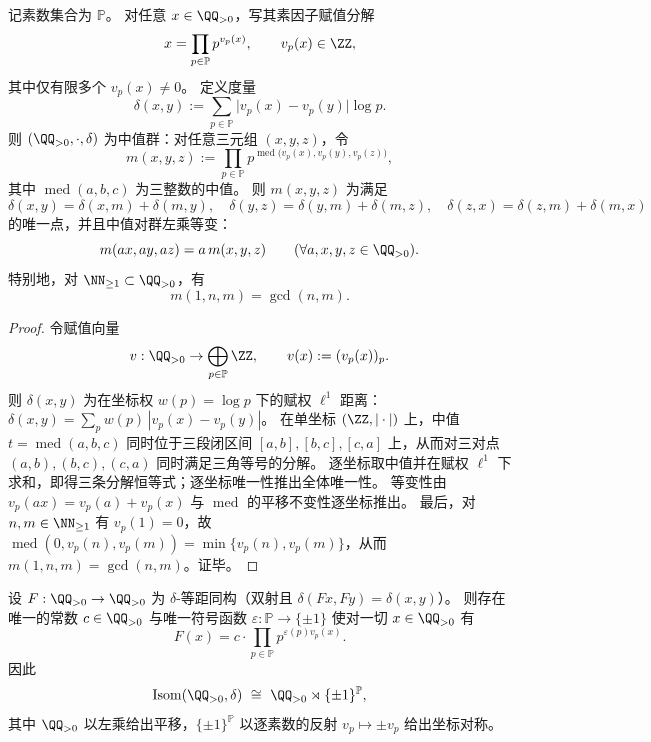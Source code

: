 \begin{theorem}[素因子赋值度量的中值群结构]\label{thm:conclusion-valuation-median-group}
记素数集合为 \(\mathbb P\)。
对任意 \(x\in\QQ_{>0}\)，写其素因子赋值分解
\[
x=\prod_{p\in\mathbb P}p^{v_p(x)},\qquad v_p(x)\in\ZZ,
\]
其中仅有限多个 \(v_p(x)\neq 0\)。
定义度量
\[
\delta(x,y):=\sum_{p\in\mathbb P}\bigl|v_p(x)-v_p(y)\bigr|\log p.
\]
则 \((\QQ_{>0},\cdot,\delta)\) 为中值群：对任意三元组 \((x,y,z)\)，令
\[
m(x,y,z):=\prod_{p\in\mathbb P}p^{\operatorname{med}\bigl(v_p(x),v_p(y),v_p(z)\bigr)},
\]
其中 \(\operatorname{med}(a,b,c)\) 为三整数的中值。
则 \(m(x,y,z)\) 为满足
\[
\delta(x,y)=\delta(x,m)+\delta(m,y),\quad
\delta(y,z)=\delta(y,m)+\delta(m,z),\quad
\delta(z,x)=\delta(z,m)+\delta(m,x)
\]
的唯一点，并且中值对群左乘等变：
\[
m(ax,ay,az)=a\,m(x,y,z)\qquad(\forall a,x,y,z\in\QQ_{>0}).
\]
特别地，对 \(\NN_{\ge 1}\subset\QQ_{>0}\)，有
\[
m(1,n,m)=\gcd(n,m).
\]
\end{theorem}

\begin{proof}
令赋值向量
\[
v:\QQ_{>0}\to \bigoplus_{p\in\mathbb P}\ZZ,\qquad v(x):=(v_p(x))_{p}.
\]
则 \(\delta(x,y)\) 为在坐标权 \(w(p)=\log p\) 下的赋权 \(\ell^1\) 距离：
\(
\delta(x,y)=\sum_p w(p)\,|v_p(x)-v_p(y)|
\)。
在单坐标 \((\ZZ,|\cdot|)\) 上，中值 \(t=\operatorname{med}(a,b,c)\) 同时位于三段闭区间 \([a,b],[b,c],[c,a]\) 上，从而对三对点 \((a,b),(b,c),(c,a)\) 同时满足三角等号的分解。
逐坐标取中值并在赋权 \(\ell^1\) 下求和，即得三条分解恒等式；逐坐标唯一性推出全体唯一性。
等变性由 \(v_p(ax)=v_p(a)+v_p(x)\) 与 \(\operatorname{med}\) 的平移不变性逐坐标推出。
最后，对 \(n,m\in\NN_{\ge 1}\) 有 \(v_p(1)=0\)，故
\(
\operatorname{med}(0,v_p(n),v_p(m))=\min\{v_p(n),v_p(m)\}
\)，从而 \(m(1,n,m)=\gcd(n,m)\)。证毕。
\end{proof}

\begin{theorem}\label{thm:conclusion-valuation-isometry-classification}
设 \(F:\QQ_{>0}\to\QQ_{>0}\) 为 \(\delta\)-等距同构（双射且 \(\delta(Fx,Fy)=\delta(x,y)\)）。
则存在唯一的常数 \(c\in\QQ_{>0}\) 与唯一符号函数 \(\varepsilon:\mathbb P\to\{\pm 1\}\) 使对一切 \(x\in\QQ_{>0}\) 有
\[
F(x)=c\cdot \prod_{p\in\mathbb P}p^{\varepsilon(p)v_p(x)}.
\]
因此
\[
\operatorname{Isom}(\QQ_{>0},\delta)\ \cong\ \QQ_{>0}\rtimes \{\pm 1\}^{\mathbb P},
\]
其中 \(\QQ_{>0}\) 以左乘给出平移，\(\{\pm 1\}^{\mathbb P}\) 以逐素数的反射 \(v_p\mapsto \pm v_p\) 给出坐标对称。
\end{theorem}

